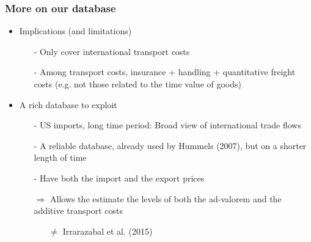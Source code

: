 \documentclass[10 pt,Helvetica, french]{beamer}
\begin{document}
\begin{frame}
\frametitle{More on our database}
\begin{itemize}
\item Implications (and limitations) \vspace{0.1cm}
\begin{itemize}
\item[-] Only cover international transport costs \vspace{0.1cm}
\item[-] Among transport costs, insurance + handling + quantitative freight costs (e.g. not those related to the time value of goods) \vspace{0.1cm}
\end{itemize}
\item A rich database to exploit \vspace{0.1cm}
\begin{itemize}
\item[-] US imports, long time period: Broad view of international trade flows \vspace{0.1cm}
\item[-] A reliable database, already used by Hummels (2007), but on a shorter length of time \vspace{0.1cm}
\item[-] Have both the import and the export prices  \vspace{0.1cm}
\item[$\Rightarrow$] Allows the estimate the levels of both the ad-valorem and the additive transport costs  \vspace{0.1cm}
\begin{itemize}
\item[$\neq$] Irrarazabal et al. (2015)
\end{itemize}
\end{itemize}
\end{itemize}
\end{frame}
\end{document}
